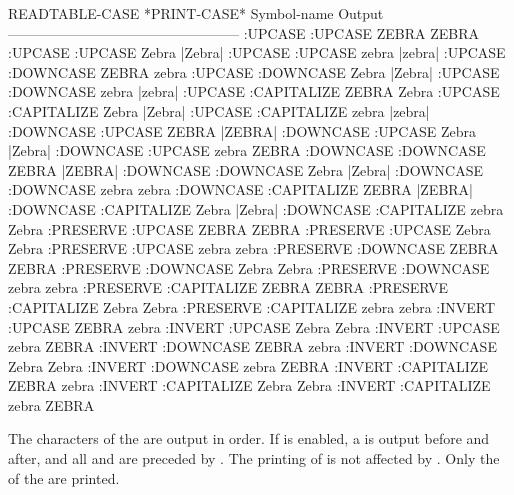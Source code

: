 \code
    READTABLE-CASE *PRINT-CASE*  Symbol-name  Output
    --------------------------------------------------
    :UPCASE        :UPCASE       ZEBRA        ZEBRA
    :UPCASE        :UPCASE       Zebra        |Zebra|
    :UPCASE        :UPCASE       zebra        |zebra|
    :UPCASE        :DOWNCASE     ZEBRA        zebra
    :UPCASE        :DOWNCASE     Zebra        |Zebra|
    :UPCASE        :DOWNCASE     zebra        |zebra|
    :UPCASE        :CAPITALIZE   ZEBRA        Zebra
    :UPCASE        :CAPITALIZE   Zebra        |Zebra|
    :UPCASE        :CAPITALIZE   zebra        |zebra|
    :DOWNCASE      :UPCASE       ZEBRA        |ZEBRA|
    :DOWNCASE      :UPCASE       Zebra        |Zebra|
    :DOWNCASE      :UPCASE       zebra        ZEBRA
    :DOWNCASE      :DOWNCASE     ZEBRA        |ZEBRA|
    :DOWNCASE      :DOWNCASE     Zebra        |Zebra|
    :DOWNCASE      :DOWNCASE     zebra        zebra
    :DOWNCASE      :CAPITALIZE   ZEBRA        |ZEBRA|
    :DOWNCASE      :CAPITALIZE   Zebra        |Zebra|
    :DOWNCASE      :CAPITALIZE   zebra        Zebra
    :PRESERVE      :UPCASE       ZEBRA        ZEBRA
    :PRESERVE      :UPCASE       Zebra        Zebra
    :PRESERVE      :UPCASE       zebra        zebra
    :PRESERVE      :DOWNCASE     ZEBRA        ZEBRA
    :PRESERVE      :DOWNCASE     Zebra        Zebra
    :PRESERVE      :DOWNCASE     zebra        zebra
    :PRESERVE      :CAPITALIZE   ZEBRA        ZEBRA
    :PRESERVE      :CAPITALIZE   Zebra        Zebra
    :PRESERVE      :CAPITALIZE   zebra        zebra
    :INVERT        :UPCASE       ZEBRA        zebra
    :INVERT        :UPCASE       Zebra        Zebra
    :INVERT        :UPCASE       zebra        ZEBRA
    :INVERT        :DOWNCASE     ZEBRA        zebra
    :INVERT        :DOWNCASE     Zebra        Zebra
    :INVERT        :DOWNCASE     zebra        ZEBRA
    :INVERT        :CAPITALIZE   ZEBRA        zebra
    :INVERT        :CAPITALIZE   Zebra        Zebra
    :INVERT        :CAPITALIZE   zebra        ZEBRA
\endcode

\endsubsubsubsubsection%

\endsubsubsubsection%

\endsubsubsection%

The characters of the  are output in order.
If  is enabled,
a  is output before and after, and all
 and  are preceded by .
The printing of  is not affected by .
Only the   of the  are printed.

